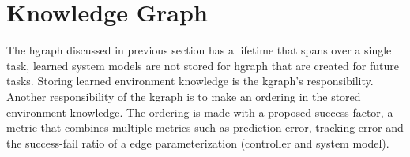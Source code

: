 \section{Knowledge Graph}%
\label{sec:kgraph}
The \ac{hgraph} discussed in previous section has a lifetime that spans over a single task, learned system models are not stored for \ac{hgraph} that are created for future tasks. Storing learned environment knowledge is the \ac{kgraph}'s responsibility. Another responsibility of the \ac{kgraph} is to make an ordering in the stored environment knowledge. The ordering is made with a proposed success factor, a metric that combines multiple metrics such as prediction error, tracking error and the success-fail ratio of a edge parameterization (controller and system model). 







